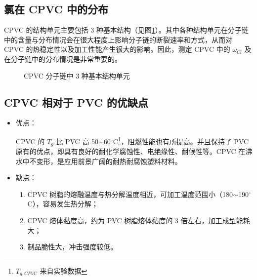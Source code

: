 \documentclass[a4paper, oneside, onecolumn, 12pt]{ctexrep}    %
\newcommand{\cd}{$^{\circ}$C}  %
\begin{document}
\subsection{氯在 CPVC 中的分布}
CPVC 的结构单元主要包括 3 种基本结构（见图\ref{fig1}）。其中各种结构单元在分子链中的含量与分布情况会在很大程度上影响分子链的断裂速率和方式，从而对 CPVC 的热稳定性以及加工性能产生很大的影响。因此，测定 CPVC 中的 $\omega_{Cl}$ 及在分子链中的分布情况是非常重要的。

\begin{figure}[htbp]
    \begin{center}
        \begin{minipage}[t]{0.2\linewidth}
            \centering
        \end{minipage}
        \begin{minipage}[t]{0.2\linewidth}
            \centering
        \end{minipage}
        \begin{minipage}[t]{0.2\linewidth}
            \centering
        \end{minipage}
    \end{center}
    \caption{CPVC 分子链中 3 种基本结构单元}
    \label{fig1}
\end{figure}

\subsection{CPVC 相对于 PVC 的优缺点}
\begin{itemize}
    \item{
        优点：\par
        CPVC 的 $T_g$ 比 PVC 高 50$\sim$60\cd\footnote{$T_{g, CPVC}$ 来自实验数据}，阻燃性能也有所提高。并且保持了 PVC 原有的优点，即具有良好的耐化学腐蚀性、电绝缘性、耐候性等。CPVC 在沸水中不变形，是应用前景广阔的耐热耐腐蚀塑料材料。
    }
    \item{
        缺点：\par
        \begin{enumerate}[(1) ]
            \item CPVC 树脂的熔融温度与热分解温度相近，可加工温度范围小（180$\sim$190\cd），容易发生热分解；
            \item CPVC 熔体黏度高，约为 PVC 树脂熔体黏度的 3 倍左右，加工成型能耗大；
            \item 制品脆性大，冲击强度较低。
        \end{enumerate}
    }
\end{itemize}
\end{document}
